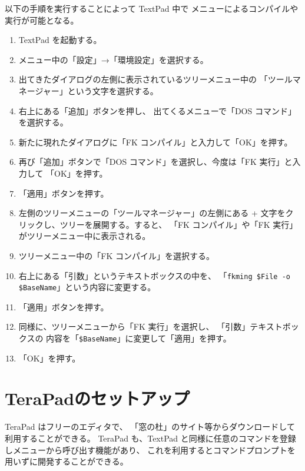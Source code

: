 \documentclass[a4j]{jarticle}
\begin{document}
以下の手順を実行することによって TextPad 中で
メニューによるコンパイルや実行が可能となる。
\begin{enumerate}
\item TextPad を起動する。

\item メニュー中の「設定」→「環境設定」を選択する。

\item 出てきたダイアログの左側に表示されているツリーメニュー中の
	「ツールマネージャー」という文字を選択する。

\item 右上にある「追加」ボタンを押し、
	出てくるメニューで「DOS コマンド」を選択する。

\item 新たに現れたダイアログに「FK コンパイル」と入力して「OK」を押す。

\item 再び「追加」ボタンで「DOS コマンド」を選択し、今度は「FK 実行」と入力して
	「OK」を押す。

\item 「適用」ボタンを押す。

\item 左側のツリーメニューの「ツールマネージャー」の左側にある
	+ 文字をクリックし、ツリーを展開する。すると、
	「FK コンパイル」や「FK 実行」がツリーメニュー中に表示される。

\item ツリーメニュー中の「FK コンパイル」を選択する。

\item  右上にある「引数」というテキストボックスの中を、
	「\verb+fkming $File -o $BaseName+」という内容に変更する。

\item  「適用」ボタンを押す。

\item  同様に、ツリーメニューから「FK 実行」を選択し、
	「引数」テキストボックスの
	内容を「\verb+$BaseName+」に変更して「適用」を押す。

\item 「OK」を押す。
\end{enumerate}

\section{TeraPadのセットアップ}
TeraPad はフリーのエディタで、
「窓の杜」のサイト等からダウンロードして利用することができる。
TeraPad も、TextPad と同様に任意のコマンドを登録しメニューから呼び出す機能があり、
これを利用するとコマンドプロンプトを用いずに開発することができる。
\end{document}
